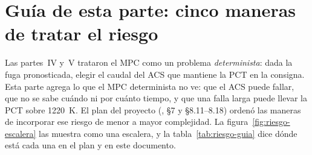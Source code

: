 \section{Guía de esta parte: cinco maneras de tratar el riesgo}\label{sec:riesgo-guia}
Las partes~IV y~V trataron el MPC como un problema \emph{determinista}: dada la fuga
pronosticada, elegir el caudal del ACS que mantiene la PCT en la consigna. Esta parte agrega lo
que el MPC determinista no ve: que el ACS puede fallar, que no se sabe cuándo ni por cuánto
tiempo, y que una falla larga puede llevar la PCT sobre 1220~K. El plan del proyecto
(, §7 y §8.11--8.18) ordenó las maneras de
incorporar ese riesgo de menor a mayor complejidad. La figura~\ref{fig:riesgo-escalera} las
muestra como una escalera, y la tabla~\ref{tab:riesgo-guia} dice dónde está cada una en el
plan y en este documento.


